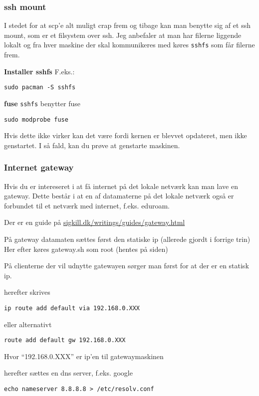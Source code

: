 \documentclass[10pt,a4paper,danish]{article}
\begin{document}
\subsubsection{ssh mount}
I stedet for at scp'e alt muligt crap frem og tibage kan man benytte sig af et
ssh mount, som er et filsystem over ssh.
Jeg anbefaler at man har filerne liggende lokalt og fra hver maskine der skal
kommunikeres med køres \texttt{sshfs} som får filerne frem.

\textbf{Installer sshfs}
F.eks.:
\begin{verbatim}
sudo pacman -S sshfs
\end{verbatim}

\textbf{fuse}
\texttt{sshfs} benytter fuse
\begin{verbatim}
sudo modprobe fuse
\end{verbatim}
Hvis dette ikke virker kan det være fordi kernen er blevvet opdateret, men ikke
genstartet. I så fald, kan du prøve at genstarte maskinen.

\subsubsection{Internet gateway}
Hvis du er intereseret i at få internet på det lokale netværk kan man lave en
gateway.
Dette består i at en af datamaterne på det lokale netværk også er forbundet til
et netværk med internet, f.eks. eduroam.

Der er en guide på \url{sigkill.dk/writings/guides/gateway.html}

På gateway datamaten sættes først den statiske ip (allerede gjordt i forrige
trin)
Her efter køres gateway.sh som root (hentes på siden)

På clienterne der vil udnytte gatewayen sørger man først for at der er en
statisk ip.

herefter skrives
\begin{verbatim}
ip route add default via 192.168.0.XXX
\end{verbatim}

eller alternativt
\begin{verbatim}
route add default gw 192.168.0.XXX
\end{verbatim}
Hvor ``192.168.0.XXX'' er ip'en til gatewaymaskinen

herefter sættes en dns server, f.eks. google
\begin{verbatim}
echo nameserver 8.8.8.8 > /etc/resolv.conf
\end{verbatim}
\end{document}
